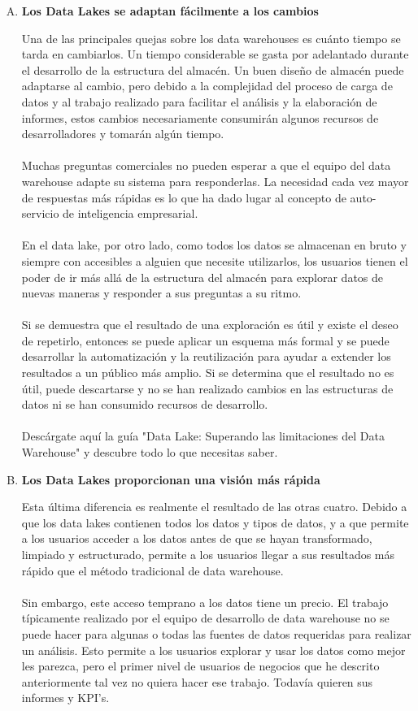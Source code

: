 \documentclass[11pt,a4paper]{article}
\begin{document}
\begin{enumerate}[A.]
\item \textbf{Los Data Lakes se adaptan fácilmente a los cambios}
				
				Una de las principales quejas sobre los data warehouses es cuánto tiempo se tarda en cambiarlos. Un tiempo considerable se gasta por adelantado durante el desarrollo de la estructura del almacén. Un buen diseño de almacén puede adaptarse al cambio, pero debido a la complejidad del proceso de carga de datos y al trabajo realizado para facilitar el análisis y la elaboración de informes, estos cambios necesariamente consumirán algunos recursos de desarrolladores y tomarán algún tiempo.\\
				\\
				Muchas preguntas comerciales no pueden esperar a que el equipo del data warehouse adapte su sistema para responderlas. La necesidad cada vez mayor de respuestas más rápidas es lo que ha dado lugar al concepto de auto-servicio de inteligencia empresarial.\\
				\\
				En el data lake, por otro lado, como todos los datos se almacenan en bruto y siempre con accesibles a alguien que necesite utilizarlos, los usuarios tienen el poder de ir más allá de la estructura del almacén para explorar datos de nuevas maneras y responder a sus preguntas a su ritmo.\\
				\\
				Si se demuestra que el resultado de una exploración es útil y existe el deseo de repetirlo, entonces se puede aplicar un esquema más formal y se puede desarrollar la automatización y la reutilización para ayudar a extender los resultados a un público más amplio. Si se determina que el resultado no es útil, puede descartarse y no se han realizado cambios en las estructuras de datos ni se han consumido recursos de desarrollo.\\
				\\
				Descárgate aquí la guía "Data Lake: Superando las limitaciones del Data Warehouse" y descubre todo lo que necesitas saber. 
	\item \textbf{Los Data Lakes proporcionan una visión más rápida}
				
				Esta última diferencia es realmente el resultado de las otras cuatro. Debido a que los data lakes contienen todos los datos y tipos de datos, y a que permite a los usuarios acceder a los datos antes de que se hayan transformado, limpiado y estructurado, permite a los usuarios llegar a sus resultados más rápido que el método tradicional de data warehouse.\\
				\\
				Sin embargo, este acceso temprano a los datos tiene un precio. El trabajo típicamente realizado por el equipo de desarrollo de data warehouse no se puede hacer para algunas o todas las fuentes de datos requeridas para realizar un análisis. Esto permite a los usuarios explorar y usar los datos como mejor les parezca, pero el primer nivel de usuarios de negocios que he descrito anteriormente tal vez no quiera hacer ese trabajo. Todavía quieren sus informes y KPI's.\\

		\end{enumerate}
		\newpage

		
		
		
	
\end{document}

